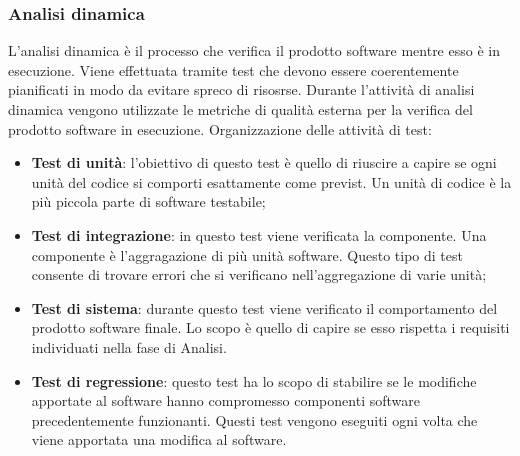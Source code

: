     \subsubsection{Analisi dinamica}
    L'analisi dinamica è il processo che verifica il prodotto software mentre esso è in esecuzione. Viene effettuata tramite test che devono essere coerentemente pianificati in modo da evitare spreco di risosrse.
    Durante l'attività di analisi dinamica vengono utilizzate le metriche di qualità esterna per la verifica del prodotto software in esecuzione.
    Organizzazione delle attività di test:
    \begin{itemize}
      \item \textbf{Test di unità}: l'obiettivo di questo test è quello di riuscire a capire se ogni unità del codice si comporti esattamente come previst. Un unità di codice è la più piccola parte di software testabile;
      \item \textbf{Test di integrazione}: in questo test viene verificata la componente. Una componente è l'aggragazione di più unità software.
      Questo tipo di test consente di trovare errori che si verificano nell'aggregazione di varie unità;
      \item \textbf{Test di sistema}: durante questo test viene verificato il comportamento del prodotto software finale. Lo scopo è quello di capire se esso rispetta i requisiti individuati nella fase di Analisi.
      \item \textbf{Test di regressione}: questo test ha lo scopo di stabilire se le modifiche apportate al software hanno compromesso componenti software precedentemente funzionanti.
      Questi test vengono eseguiti ogni volta che viene apportata una modifica al software.
    \end{itemize}
